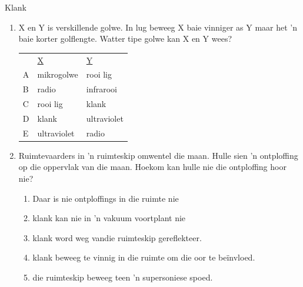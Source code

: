 \begin{eocexercises}{Klank}
\begin{enumerate}[noitemsep, label=\textbf{\arabic*}. ]
\item X en Y is verskillende golwe. In lug beweeg X baie vinniger as Y maar het  'n baie korter golflengte. Watter tipe golwe kan X en Y wees? 
          \begin{table}[H]
        \begin{center}
      \label{m38800*id186268}
    \noindent
          \tablelasttail{}
      \begin{xtabular}[t]{|l|l|l|}\hline
         &
        \uline{X} &
        \uline{Y}%
     \tabularnewline{}
        A &
        mikrogolwe &
        rooi lig%
     \tabularnewline{}
        B &
        radio &
        infrarooi%
     \tabularnewline{}
        C &
        rooi lig &
        klank%
     \tabularnewline{}
        D &
        klank &
        ultraviolet%
     \tabularnewline{}
        E &
        ultraviolet &
        radio%
     \tabularnewline{}
    \end{xtabular}
      \end{center}
\end{table}
    \par

\item Ruimtevaarders in  'n ruimteskip omwentel die maan. Hulle sien  'n ontploffing op die oppervlak van die maan. Hoekom kan hulle nie die ontploffing hoor nie?
\begin{enumerate}[noitemsep, label=\textbf{\alph*}. ] 
    \item Daar is nie ontploffings in die ruimte nie
    \item klank kan nie in  'n vakuum voortplant nie
    \item klank word weg vandie ruimteskip gereflekteer.
    \item klank beweeg te vinnig in die ruimte om die oor te be\"invloed.
    \item die ruimteskip beweeg teen  'n supersoniese spoed.
\end{enumerate}


\end{enumerate}
\end{eocexercises}
